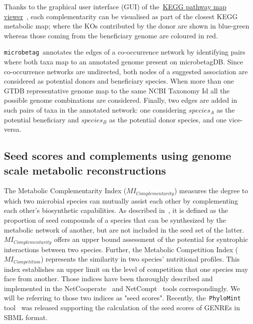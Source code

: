 \documentclass[sn-mathphys,Numbered]{sn-jnl}  %
\theoremstyle{thmstyleone}%
\theoremstyle{thmstyletwo}%
\theoremstyle{thmstylethree}%
\newcommand{\microbetag}{\texttt{microbetag }}
\begin{document}
        Thanks to the graphical user interface (GUI) of the~\href{https://www.kegg.jp/kegg/docs/color_gui.html}{KEGG pathway map viewer}~\cite{kanehisa2020kegg,kanehisa2022kegg}, 
        each complementarity can be visualised as part of the closest KEGG metabolic map; 
        where the KOs contributed by the donor are shown in blue-green whereas those coming from the beneficiary genome are coloured in red.

        \microbetag annotates the edges of a co-occurrence network by identifying pairs where both taxa map to an annotated genome present on microbetagDB.
        Since co-occurrence networks are undirected, both nodes of a suggested association are considered as potential donors and beneficiary species. 
        When more than one GTDB representative genome map to the same NCBI Taxonomy Id all the possible genome combinations are considered.
        Finally, two edges are added in such pairs of taxa in the annotated network: 
        one considering $species_A$ as the potential beneficiary and $species_B$ as the potential donor species, and one vice-versa. 


    \subsection*{Seed scores and complements using genome scale metabolic reconstructions }
    \label{subsec:seeds}

        The Metabolic Complementarity Index ($MI_{Complementarity}$) measures the degree to which two microbial species can mutually assist each other by complementing each other's biosynthetic capabilities.
        As described in~\cite{phylomint_ms}, it is defined as the proportion of seed compounds of a species that can be synthesized by the metabolic network of another, but are not included in the seed set of the latter. 
        $MI_{Complementarity}$ offers an upper bound assessment of the potential for syntrophic interactions between two species.
        Further, the Metabolic Competition Index ($MI_{Competition}$) represents the similarity in two species' nutritional profiles. 
        This index establishes an upper limit on the level of competition that one species may face from another.
        Those indices have been thoroughly described and implemented in the NetCooperate~\cite{levy2015netcooperate} and NetCompt~\cite{kreimer2012netcmpt} tools correspondingly.
        We will be referring to those two indices as "seed scores".
        Recently, the~\texttt{PhyloMint} tool~\cite{phylomint_ms} was released supporting the calculation of the seed scores of GENREs in SBML format.
\end{document}
